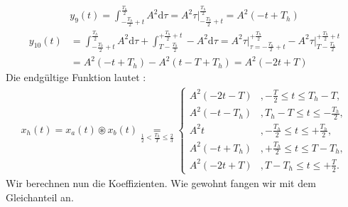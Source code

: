 \documentclass[11pt,a4paper,DIV=12]{scrartcl}
\newcommand{\diff}{\mathrm{d}}
\begin{document}
%
%
\begin{align}
	y_9(t)=\int_{-\frac{T_h}{2}+t}^{\frac{T_h}{2}}A^2\diff \tau=A^2\tau\Bigg |_{-\frac{T_h}{2}+t}^{\frac{T_h}{2}}=A^2(-t+T_h)
\end{align}
%
%
\begin{align}
	y_{10}(t)&=\int_{-\frac{T_h}{2}+t}^{\frac{T_h}{2}}A^2\diff \tau+\int_{T-\frac{T_h}{2}}^{+\frac{T_h}{2}+t}-A^2\diff \tau=A^2\tau\Bigg |_{\tau=-\frac{T_h}{2}+t}^{+\frac{T_h}{2}}-A^2\tau\Bigg |_{T-\frac{T_h}{2}}^{+\frac{T_h}{2}+t}\nonumber \\
	&=A^2(-t+T_h)-A^2(t-T+T_h)=A^2(-2t+T)
\end{align}
%
%
Die endgültige Funktion lautet :
%
%
\begin{align}
	x_{h}(t)=x_{a}(t)\circledast x_{b}(t)
	\underset{\frac{1}{2}<\frac{T_h}{T}\leq \frac{2}{3}}{=}
	\begin{cases}
		A^2(-2t-T) &,-\frac{T}{2}\leq t\leq  T_h-T, \\
		A^2(-t-T_h)&,T_h-T\leq t \leq -\frac{T_h}{2},\\
		A^2t &,-\frac{T_h}{2}\leq t \leq +\frac{T_h}{2},\\
		A^2(-t+T_h) &,+\frac{T_h}{2}\leq t \leq T-T_h, \\
		A^2(-2t+T) &,T-T_h \leq t \leq +\frac{T}{2}.
	\end{cases}
\end{align}
%
%
Wir berechnen nun die Koeffizienten. Wie gewohnt fangen wir mit dem Gleichanteil an.
%
%
\end{document}
